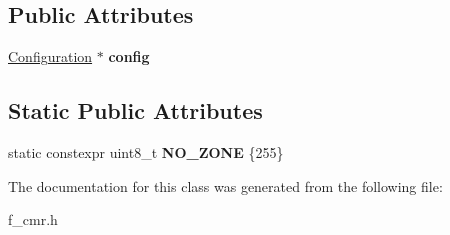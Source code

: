 \subsection*{Public Attributes}
\begin{DoxyCompactItemize}
\item 
\mbox{\label{classanalyzer_1_1_channelling_movement_recognizer_a7b3aebb6f9bf65cc0d482d076669a369}} 
\mbox{\hyperlink{classanalyzer_1_1_channelling_movement_recognizer_1_1_configuration}{Configuration}} $\ast$ {\bfseries config}
\end{DoxyCompactItemize}
\subsection*{Static Public Attributes}
\begin{DoxyCompactItemize}
\item 
\mbox{\label{classanalyzer_1_1_channelling_movement_recognizer_a71181360a27033ed497168ec96e3821e}} 
static constexpr uint8\+\_\+t {\bfseries N\+O\+\_\+\+Z\+O\+NE} \{255\}
\end{DoxyCompactItemize}


The documentation for this class was generated from the following file\+:\begin{DoxyCompactItemize}
\item 
f\+\_\+cmr.\+h\end{DoxyCompactItemize}

